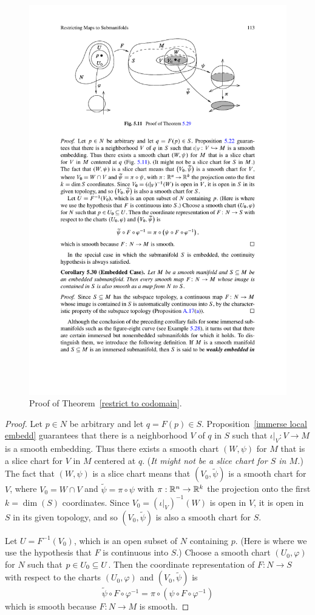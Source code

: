 \begin{figure}[h]
\centering
\includegraphics{pictures/restriction-codomain}
\caption{Proof of Theorem~\ref{restrict to codomain}.}
\end{figure}
\begin{proof}
Let $p\in N$ be arbitrary and let $q=F(p)\in S$. Proposition~\ref{immerse local embedd} guarantees that there is a neighborhood $V$ of $q$ in $S$ such that $\iota|_V:V\to M$ is a smooth embedding. Thus there exists a smooth chart $(W,\psi)$ for $M$ that is a slice chart for $V$ in $M$ centered at $q$. (\textit{It might not be a slice chart for $S$ in $M$.}) The fact that $(W,\psi)$ is a slice chart means that $(V_0,\tilde{\psi})$ is a smooth chart for $V$, where $V_0=W\cap V$ and $\tilde{\psi}=\pi\circ\psi$ with $\pi:\mathbb{R}^n\to\mathbb{R}^k$ the projection onto the first $k=\dim(S)$ coordinates. Since $V_0=(\iota|_V)^{-1}(W)$ is open in $V$, it is open in $S$ in its
given topology, and so $(V_0,\tilde{\psi})$ is also a smooth chart for $S$.\par
Let $U=F^{-1}(V_0)$, which is an open subset of $N$ containing $p$. (Here is where we use the hypothesis that $F$ is continuous into $S$.) Choose a smooth chart $(U_0,\varphi)$ for $N$ such that $p\in U_0\subseteq U$. Then the coordinate representation of $F:N\to S$ with respect to the charts $(U_0,\varphi)$ and $(V_0,\tilde{\psi})$ is
\[\tilde{\psi}\circ F\circ\varphi^{-1}=\pi\circ(\psi\circ F\circ\varphi^{-1})\]
which is smooth because $F:N\to M$ is smooth.
\end{proof}
